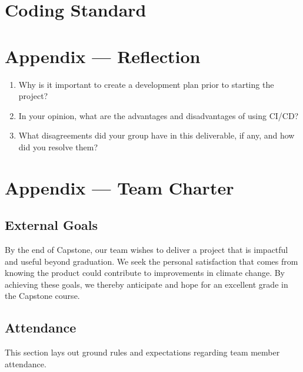 \documentclass{article}
\begin{document}

\section{Coding Standard}


\newpage{}

\section*{Appendix --- Reflection}




\begin{enumerate}
    \item Why is it important to create a development plan prior to starting the
    project?
    \item In your opinion, what are the advantages and disadvantages of using
    CI/CD?
    \item What disagreements did your group have in this deliverable, if any,
    and how did you resolve them?
\end{enumerate}

\newpage{}

\section*{Appendix --- Team Charter \cite{ref1}}

\subsection*{External Goals}

By the end of Capstone, our team wishes to deliver a project that is impactful
and useful beyond graduation. We seek the personal satisfaction that comes from
knowing the product could contribute to improvements in climate change. By achieving 
these goals, we thereby anticipate and hope for an excellent grade in the Capstone
course.

\subsection*{Attendance}

This section lays out ground rules and expectations regarding team member attendance.
\end{document}

